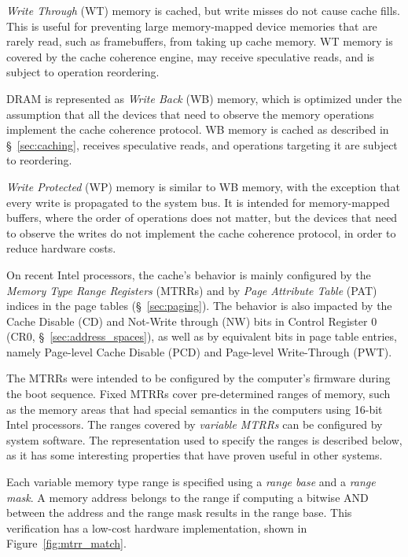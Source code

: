 \textit{Write Through} (WT) memory is cached, but write misses do not cause
cache fills. This is useful for preventing large memory-mapped device memories
that are rarely read, such as framebuffers, from taking up cache memory. WT
memory is covered by the cache coherence engine, may receive speculative reads,
and is subject to operation reordering.

DRAM is represented as \textit{Write Back} (WB) memory, which is optimized
under the assumption that all the devices that need to observe the memory
operations implement the cache coherence protocol. WB memory is cached as
described in \S~\ref{sec:caching}, receives speculative reads, and operations
targeting it are subject to reordering.

\textit{Write Protected} (WP) memory is similar to WB memory, with the
exception that every write is propagated to the system bus. It is intended for
memory-mapped buffers, where the order of operations does not matter, but the
devices that need to observe the writes do not implement the cache coherence
protocol, in order to reduce hardware costs.


On recent Intel processors, the cache's behavior is mainly configured by the
\textit{Memory Type Range Registers} (MTRRs) and by
\textit{Page Attribute Table} (PAT) indices in the page tables
(\S~\ref{sec:paging}). The behavior is also impacted by the Cache Disable (CD)
and Not-Write through (NW) bits in Control Register 0
(CR0, \S~\ref{sec:address_spaces}), as well as by equivalent bits in page table
entries, namely Page-level Cache Disable (PCD) and Page-level Write-Through
(PWT).

The MTRRs were intended to be configured by the computer's firmware during the
boot sequence. Fixed MTRRs cover pre-determined ranges of memory, such as the
memory areas that had special semantics in the computers using 16-bit Intel
processors. The ranges covered by \textit{variable MTRRs} can be configured by
system software. The representation used to specify the ranges is described
below, as it has some interesting properties that have proven useful in other
systems.


Each variable memory type range is specified using a \textit{range base} and a
\textit{range mask}. A memory address belongs to the range if computing a
bitwise AND between the address and the range mask results in the range base.
This verification has a low-cost hardware implementation, shown in
Figure~\ref{fig:mtrr_match}.

